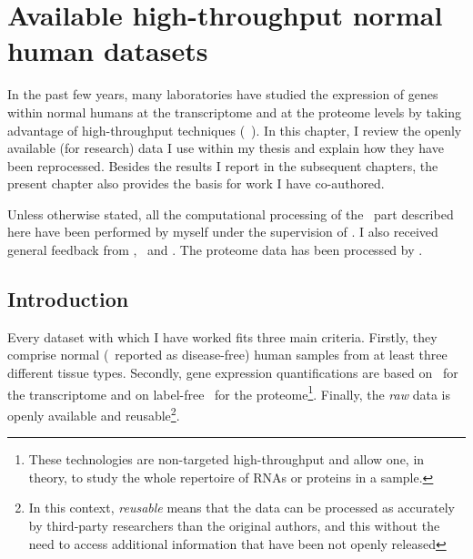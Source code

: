 \chapter{Available high-throughput normal human datasets}\label{ch:datasets}

\begin{comment}
\setlength{\epigraphwidth}{0.8\textwidth}%
\setlength{\epigraphrule}{0pt}%
\epigraphhead[70]{%
\epigraph{Data! Data! Data! I can’t make bricks without clay!}{Sherlock Homes\\
(Sir Arthur Conan Doyle)}}
\end{comment}


In the past few years, many laboratories have studied the expression
of genes within normal humans at the transcriptome and at
the proteome levels by taking advantage of high-throughput techniques
(\eg\ \citet{Krupp2012,VTpaper,ramskoldan:2009,Uhlen2014,%
Uhlen2015,UhlenGastro,GTExTranscript,PeptideAtlas,PandeyData,KusterData}).
In this chapter, I review the openly available (for research) data
I use within my thesis
and explain how they have been reprocessed.
Besides the results I report in the subsequent chapters,
the present chapter also provides the basis for work
I have co-authored.

Unless otherwise stated, all the computational processing of the \Rnaseq\ part
described here have been performed by myself under the supervision of
\alvis. I also received general feedback from \mar,
\johan\ and \nuno. The proteome data has been processed by \james.


\section{Introduction}

Every dataset with which I have worked fits three main criteria.
Firstly, they comprise normal (\ie\ reported as disease-free) human samples
from at least three different tissue types.
Secondly, gene expression
quantifications are based on \Rnaseq\ for the transcriptome and on label-free \ms\
for the proteome\footnote{These
technologies are non-targeted high-throughput and
allow one, in theory, to study the whole
repertoire of \glspl{RNA} or proteins in a sample.}.
Finally, the \emph{raw} data is openly available and reusable\footnote{%
In this context, \emph{reusable} means that the data can be processed
as accurately by third-party researchers than the original authors,
and this without the need to access additional information
that have been not openly released}.


